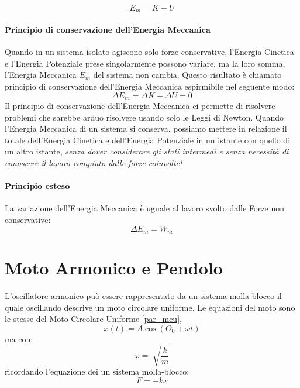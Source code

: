         \begin{equation}
            E_m = K + U
        \end{equation}

        \paragraph{Principio di conservazione dell'Energia Meccanica} Quando in 
        un sistema isolato agiscono solo forze conservative, l'Energia Cinetica 
        e l'Energia Potenziale prese singolarmente possono variare, ma la loro
        somma, l'Energia Meccanica $E_m$ del sistema non cambia. Questo 
        risultato è chiamato principio di conservazione dell'Energia Meccanica
        espirmibile nel seguente modo:
        \begin{equation}
            \Delta E_m = \Delta K + \Delta U = 0
        \end{equation}
        Il principio di conservazione dell'Energia Meccanica ci permette di 
        risolvere problemi che sarebbe arduo risolvere usando solo le Leggi di 
        Newton.
        Quando l'Energia Meccanica di un sistema si conserva, possiamo mettere
        in relazione il totale dell'Energia Cinetica e dell'Energia Potenziale
        in un istante con quello di un altro istante, \textit{senza dover
        considerare gli stati intermedi e senza necessità di conoscere il lavoro
        compiuto dalle forze coinvolte!}

        \paragraph{Principio esteso} La variazione dell'Energia Meccanica è 
        uguale al lavoro svolto dalle Forze non conservative:
        \begin{equation}
            \Delta E_m = W_{nc}
        \end{equation}
        

    \section{Moto Armonico e Pendolo} L'oscillatore armonico può essere 
    rappresentato da un sistema molla-blocco il quale oscillando descrive un 
    moto circolare uniforme. Le equazioni del moto sono le stesse del Moto 
    Circolare Uniforme \ref{par_mcu},
        \begin{equation}
            x(t) = A \cos(\Theta_0 + \omega t)
        \end{equation}
        ma con:
        \begin{equation*}
            \omega = \sqrt[]{\frac{k}{m}}
        \end{equation*}
        ricordando l'equazione dei un sistema molla-blocco:
        \begin{equation*}
            F = -kx
        \end{equation*}
        
